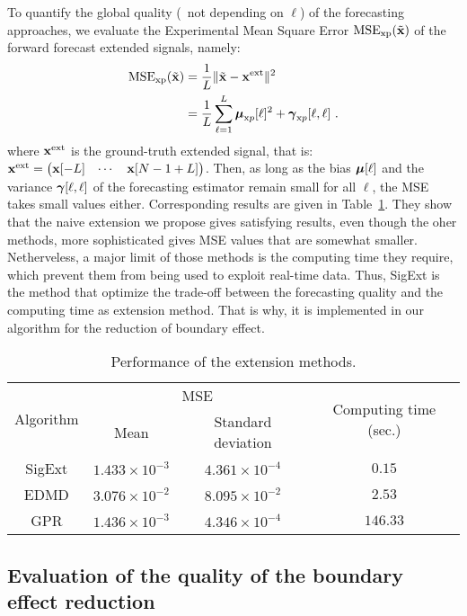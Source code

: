 To quantify the global quality (\ie~not depending on $\ell$) of the forecasting approaches, we evaluate the Experimental Mean Square Error $\mathrm{MSE_{xp}}(\tilde{{\mathbf x}})$ of the forward forecast extended signals, namely:
\begin{align}
\label{eq:mse}
\mathrm{MSE_{{\mathrm xp}}}(\tilde{{\mathbf x}}) &= \dfrac1{L}\|\tilde{{\mathbf x}} -{\mathbf x}^\mathrm{ext}\|^2 \\
\nonumber
&= \dfrac1{L}\sum_{\ell=1}^L \boldsymbol{\mu}_{{\mathrm xp}}[\ell]^2 + \boldsymbol{\gamma}_{{\mathrm xp}}[\ell,\ell]\ .
\end{align}
where ${\mathbf x}^\mathrm{ext}$ is the ground-truth extended signal, that is: ${\mathbf x}^\mathrm{ext} = \begin{pmatrix}{\mathbf x}[-L] & \cdots & {\mathbf x}[N-1+L] \end{pmatrix}$. Then, as long as the bias $\boldsymbol{\mu}[\ell]$ and the variance $\boldsymbol{\gamma}[\ell,\ell]$ of the forecasting estimator remain small for all $\ell$, the MSE takes small values either. Corresponding results are given in Table~\ref{tab:mse.sine}. They show that the naive extension we propose gives satisfying results, even though the oher methods, more sophisticated gives MSE values that are somewhat smaller. Netherveless, a major limit of those methods is the computing time they require, which prevent them from being used to exploit real-time data. Thus, {\sf SigExt} is the method that optimize the trade-off between the forecasting quality and the computing time as extension method. That is why, it is implemented in our algorithm for the reduction of boundary effect.

\begin{table}
\centering
\caption{Performance of the extension methods.}
\begin{tabular}{|c||c|c|c|}
  \hline
   \multirow{2}{*}{Algorithm} & \multicolumn{2}{c|}{MSE}  & \multirow{2}{*}{Computing time (sec.)} \\
   \cline{2-3} & Mean & Standard deviation & \\
   \hhline{|=#=|=|=|}
   {\sf SigExt} & $1.433\times 10^{-3}$ & $4.361\times 10^{-4}$ & $0.15$ \\
   \hline
   EDMD & $3.076\times 10^{-2}$ & $8.095\times 10^{-2}$ & $2.53$\\
   \hline
   GPR & $1.436\times 10^{-3}$ & $4.346\times 10^{-4}$ & $146.33$ \\
   \hline
\end{tabular}
\label{tab:mse.sine}
\end{table} 


\subsection{Evaluation of the quality of the boundary effect reduction}

